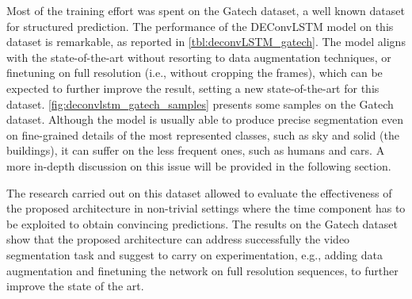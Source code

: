


Most of the training effort was spent on the Gatech dataset, a well known
dataset for structured prediction. The performance of the DEConvLSTM model on
this dataset is remarkable, as reported in \autoref{tbl:deconvLSTM_gatech}. The
model aligns with the state-of-the-art without resorting to data augmentation
techniques, or finetuning on full resolution (i.e., without cropping the
frames), which can be expected to further improve the result, setting a new
state-of-the-art for this dataset. \autoref{fig:deconvlstm_gatech_samples}
presents some samples on the Gatech dataset. Although the model is usually able
to produce precise segmentation even on fine-grained details of the most
represented classes, such as sky and solid (the buildings), it can suffer on
the less frequent ones, such as humans and cars. A more in-depth discussion on
this issue will be provided in the following section.

The research carried out on this dataset allowed to evaluate the effectiveness
of the proposed architecture in non-trivial settings where the time component
has to be exploited to obtain convincing predictions. The results on the Gatech
dataset show that the proposed architecture can address successfully the video
segmentation task and suggest to carry on experimentation, e.g., adding data
augmentation and finetuning the network on full resolution sequences, to
further improve the state of the art.

\begin{table}[t]
    \caption{Results on the Gatech dataset. Pixel accuracy is reported (higher
        is better). IoU is not reported as customary in the literature for this
        dataset.}
    \label{tbl:deconvLSTM_gatech}
\end{table}


